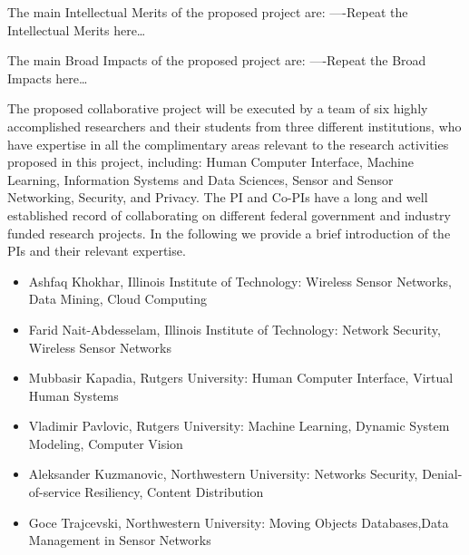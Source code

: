 The main Intellectual Merits of the proposed project are:
----Repeat the Intellectual Merits here…

The main Broad Impacts of the proposed project are:
----Repeat the Broad Impacts here…

The proposed collaborative project will be executed by a team of six highly accomplished researchers and their students from three different institutions, who have expertise in all the complimentary areas relevant to the research activities proposed in this project, including: Human Computer Interface, Machine Learning, Information Systems and Data Sciences, Sensor and Sensor Networking, Security, and Privacy. The PI and Co-PIs have a long and well established record of collaborating on different federal government and industry funded  research projects. In the following we provide a brief introduction of the PIs and their relevant expertise.
\begin{itemize}
\vspace{-3mm} \item Ashfaq Khokhar, Illinois Institute of Technology: Wireless Sensor Networks, Data Mining, Cloud Computing
\vspace{-3mm} \item Farid Nait-Abdesselam, Illinois Institute of Technology: Network Security, Wireless Sensor Networks
\vspace{-3mm} \item Mubbasir Kapadia, Rutgers University: Human Computer Interface, Virtual Human Systems
\vspace{-3mm} \item Vladimir Pavlovic, Rutgers University: Machine Learning, Dynamic System Modeling, Computer Vision
\vspace{-3mm} \item Aleksander Kuzmanovic, Northwestern University: Networks Security, Denial-of-service Resiliency, Content Distribution
\vspace{-3mm} \item Goce Trajcevski, Northwestern University: Moving Objects Databases,Data Management in Sensor Networks
\end{itemize}


